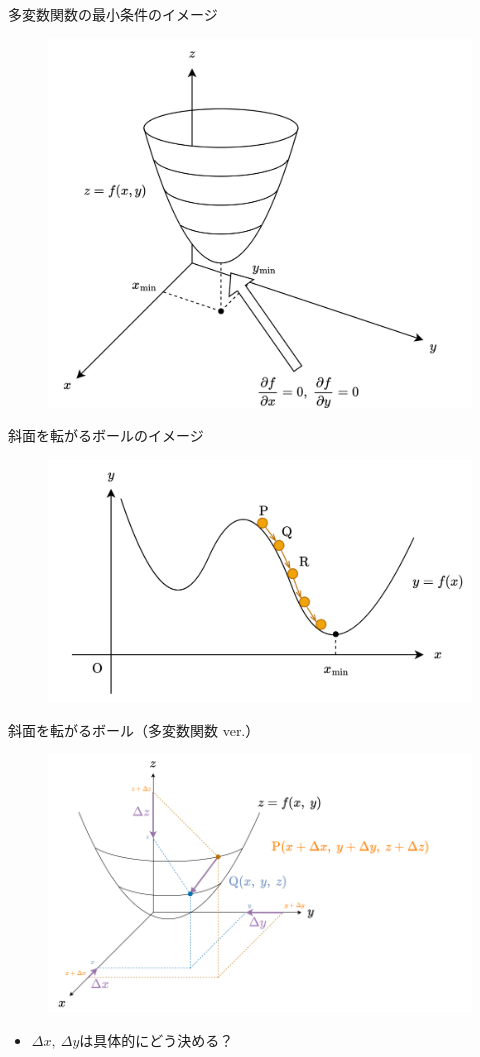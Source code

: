 \documentclass[dvipdfmx,aspectratio=169]{beamer}
\begin{document}
	\begin{frame}{多変数関数の最小条件のイメージ}
		\begin{figure}
			\centering
			\includegraphics[width=0.6\linewidth]{img/image-of-the-parameters-that-take-the-minimum-value-of-multivariable-function}
		\end{figure}
	\end{frame}
	\begin{frame}{斜面を転がるボールのイメージ}
		\begin{figure}
			\centering
			\includegraphics[width=0.7\linewidth]{img/image-of-a-ball-rolling-down-a-slope}
		\end{figure}
	\end{frame}
	\begin{frame}{斜面を転がるボール（多変数関数 ver.）}
		\begin{figure}
			\centering
			\includegraphics[width=0.7\linewidth]{img/change-in-value-of-a-multivariable-function}
		\end{figure}
		\begin{itemize}
			\item $ \Delta x,\ \Delta y $は具体的にどう決める？
		\end{itemize}
	\end{frame}
\end{document}
